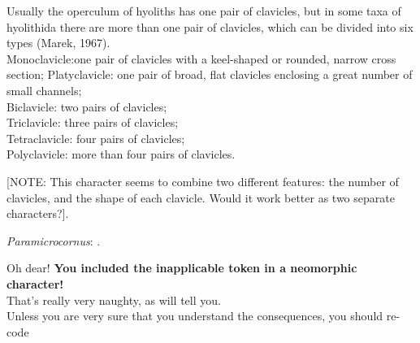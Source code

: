 \documentclass[openany]{book}
\theoremstyle{definition}
\theoremstyle{definition}
\theoremstyle{definition}
\theoremstyle{remark}
\begin{document}
Usually the operculum of hyoliths has one pair of clavicles, but in some
taxa of hyolithida there are more than one pair of clavicles, which can
be divided into six types (Marek, 1967).\\
Monoclavicle:one pair of clavicles with a keel-shaped or rounded, narrow
cross section; Platyclavicle: one pair of broad, flat clavicles
enclosing a great number of small channels;\\
Biclavicle: two pairs of clavicles;\\
Triclavicle: three pairs of clavicles;\\
Tetraclavicle: four pairs of clavicles;\\
Polyclavicle: more than four pairs of clavicles.

{[}NOTE: This character seems to combine two different features: the
number of clavicles, and the shape of each clavicle. Would it work
better as two separate characters?{]}.

\hypertarget{Paramicrocornus-coding-97}{}
\emph{Paramicrocornus}: \citet{Zhang2018Ahyolithid}.

Oh dear! \textbf{You included the inapplicable token in a neomorphic
character!}\\
That's really very naughty, as \citet{Brazeau2018} will tell you.\\
Unless you are very sure that you understand the consequences, you
should re-code
\end{document}
